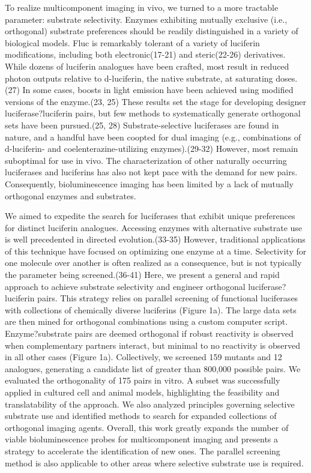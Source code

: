 To realize multicomponent imaging in vivo, we turned to a more tractable parameter: substrate selectivity. Enzymes exhibiting mutually exclusive (i.e., orthogonal) substrate preferences should be readily distinguished in a variety of biological models. Fluc is remarkably tolerant of a variety of luciferin modifications, including both electronic(17-21) and steric(22-26) derivatives. While dozens of luciferin analogues have been crafted, most result in reduced photon outputs relative to d-luciferin, the native substrate, at saturating doses.(27) In some cases, boosts in light emission have been achieved using modified versions of the enzyme.(23, 25) These results set the stage for developing designer luciferase?luciferin pairs, but few methods to systematically generate orthogonal sets have been pursued.(25, 28) Substrate-selective luciferases are found in nature, and a handful have been coopted for dual imaging (e.g., combinations of d-luciferin- and coelenterazine-utilizing enzymes).(29-32) However, most remain suboptimal for use in vivo. The characterization of other naturally occurring luciferases and luciferins has also not kept pace with the demand for new pairs. Consequently, bioluminescence imaging has been limited by a lack of mutually orthogonal enzymes and substrates.
\par
We aimed to expedite the search for luciferases that exhibit unique preferences for distinct luciferin analogues. Accessing enzymes with alternative substrate use is well precedented in directed evolution.(33-35) However, traditional applications of this technique have focused on optimizing one enzyme at a time. Selectivity for one molecule over another is often realized as a consequence, but is not typically the parameter being screened.(36-41) Here, we present a general and rapid approach to achieve substrate selectivity and engineer orthogonal luciferase?luciferin pairs. This strategy relies on parallel screening of functional luciferases with collections of chemically diverse luciferins (Figure 1a). The large data sets are then mined for orthogonal combinations using a custom computer script. Enzyme?substrate pairs are deemed orthogonal if robust reactivity is observed when complementary partners interact, but minimal to no reactivity is observed in all other cases (Figure 1a). Collectively, we screened 159 mutants and 12 analogues, generating a candidate list of greater than 800,000 possible pairs. We evaluated the orthogonality of 175 pairs in vitro. A subset was successfully applied in cultured cell and animal models, highlighting the feasibility and translatability of the approach. We also analyzed principles governing selective substrate use and identified methods to search for expanded collections of orthogonal imaging agents. Overall, this work greatly expands the number of viable bioluminescence probes for multicomponent imaging and presents a strategy to accelerate the identification of new ones. The parallel screening method is also applicable to other areas where selective substrate use is required.

